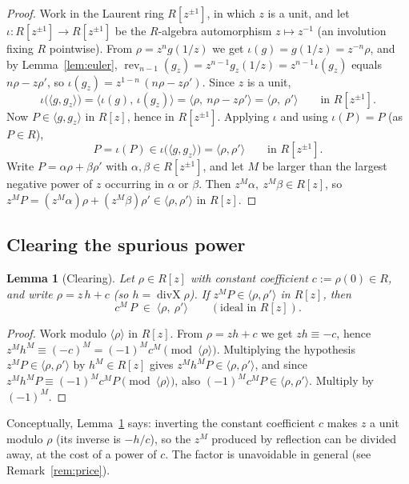 \documentclass[11pt,a4paper]{article}
\newtheorem{lemma}[theorem]{Lemma}
\theoremstyle{definition}
\newcommand{\rev}{\operatorname{rev}}
\newcommand{\divX}{\operatorname{divX}}
\newcommand{\ideal}[1]{\langle #1\rangle}
\begin{document}
\begin{proof}
Work in the Laurent ring $R[z^{\pm 1}]$, in which $z$ is a unit, and let
$\iota : R[z^{\pm1}] \to R[z^{\pm1}]$ be the $R$-algebra automorphism
$z \mapsto z^{-1}$ (an involution fixing $R$ pointwise). From
$\rho = z^n g(1/z)$ we get $\iota(g) = g(1/z) = z^{-n}\rho$, and by
Lemma~\ref{lem:euler}, $\rev_{n-1}(g_z) = z^{n-1} g_z(1/z) = z^{n-1}\iota(g_z)$
equals $n\rho - z\rho'$, so $\iota(g_z) = z^{1-n}\,(n\rho - z\rho')$. Since $z$
is a unit,
\[
  \iota\bigl(\ideal{g, g_z}\bigr)
    = \ideal{\iota(g),\, \iota(g_z)}
    = \ideal{\rho,\ n\rho - z\rho'}
    = \ideal{\rho,\ \rho'} \qquad\text{in } R[z^{\pm1}].
\]
Now $P \in \ideal{g, g_z}$ in $R[z]$, hence in $R[z^{\pm1}]$. Applying $\iota$
and using $\iota(P) = P$ (as $P \in R$),
\[
  P = \iota(P) \in \iota\bigl(\ideal{g,g_z}\bigr) = \ideal{\rho,\rho'}
  \qquad\text{in } R[z^{\pm1}] .
\]
Write $P = \alpha\rho + \beta\rho'$ with $\alpha,\beta \in R[z^{\pm1}]$, and let
$M$ be larger than the largest negative power of $z$ occurring in $\alpha$ or
$\beta$. Then $z^M\alpha,\ z^M\beta \in R[z]$, so
$z^M P = (z^M\alpha)\rho + (z^M\beta)\rho' \in \ideal{\rho,\rho'}$ in $R[z]$.
\end{proof}

\subsection{Clearing the spurious power}

\begin{lemma}[Clearing]\label{lem:clear}
Let $\rho \in R[z]$ with constant coefficient $c := \rho(0) \in R$, and write
$\rho = z\,h + c$ (so $h = \divX \rho$). If $z^M P \in \ideal{\rho,\rho'}$ in
$R[z]$, then
\[
  c^{M}\,P \;\in\; \ideal{\rho,\ \rho'} \qquad (\text{ideal in } R[z]).
\]
\end{lemma}

\begin{proof}
Work modulo $\ideal{\rho}$ in $R[z]$. From $\rho = zh + c$ we get
$z h \equiv -c$, hence $z^M h^M \equiv (-c)^M = (-1)^M c^M \pmod{\ideal{\rho}}$.
Multiplying the hypothesis $z^M P \in \ideal{\rho,\rho'}$ by $h^M \in R[z]$
gives $z^M h^M P \in \ideal{\rho,\rho'}$, and since
$z^M h^M P \equiv (-1)^M c^M P \pmod{\ideal{\rho}}$, also
$(-1)^M c^M P \in \ideal{\rho,\rho'}$. Multiply by $(-1)^M$.
\end{proof}

Conceptually, Lemma~\ref{lem:clear} says: inverting the constant coefficient
$c$ makes $z$ a unit modulo $\rho$ (its inverse is $-h/c$), so the
$z^M$ produced by reflection can be divided away, at the cost of a power of
$c$. The factor is unavoidable in general (see Remark~\ref{rem:price}).
\end{document}
